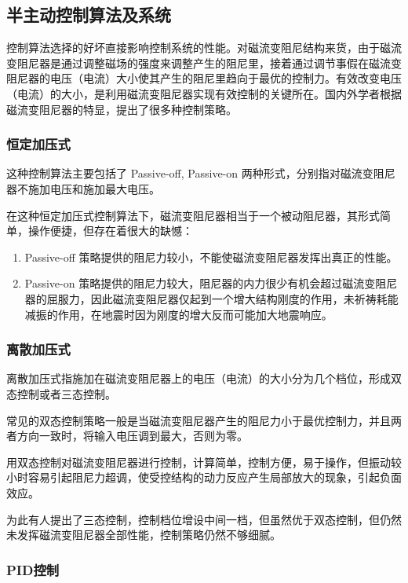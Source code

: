 
\subsection{半主动控制算法及系统}
控制算法选择的好坏直接影响控制系统的性能。对磁流变阻尼结构来货，由于磁流变阻尼器是通过调整磁场的强度来调整产生的阻尼里，接着通过调节事假在磁流变阻尼器的电压（电流）大小使其产生的阻尼里趋向于最优的控制力。有效改变电压（电流）的大小，是利用磁流变阻尼器实现有效控制的关键所在。国内外学者根据磁流变阻尼器的特显，提出了很多种控制策略。

\subsubsection{恒定加压式}
这种控制算法主要包括了 Passive-off, Passive-on 两种形式，分别指对磁流变阻尼器不施加电压和施加最大电压。

在这种恒定加压式控制算法下，磁流变阻尼器相当于一个被动阻尼器，其形式简单，操作便捷，但存在着很大的缺憾：
\begin{enumerate}
\item Passive-off 策略提供的阻尼力较小，不能使磁流变阻尼器发挥出真正的性能。
\item Passive-on 策略提供的阻尼力较大，阻尼器的内力很少有机会超过磁流变阻尼器的屈服力，因此磁流变阻尼器仅起到一个增大结构刚度的作用，未祈祷耗能减振的作用，在地震时因为刚度的增大反而可能加大地震响应。
\end{enumerate}

\subsubsection{离散加压式}
离散加压式指施加在磁流变阻尼器上的电压（电流）的大小分为几个档位，形成双态控制或者三态控制。

常见的双态控制策略一般是当磁流变阻尼器产生的阻尼力小于最优控制力，并且两者方向一致时，将输入电压调到最大，否则为零。

用双态控制对磁流变阻尼器进行控制，计算简单，控制方便，易于操作，但振动较小时容易引起阻尼力超调，使受控结构的动力反应产生局部放大的现象，引起负面效应。

为此有人提出了三态控制，控制档位增设中间一档，但虽然优于双态控制，但仍然未发挥磁流变阻尼器全部性能，控制策略仍然不够细腻。

\subsubsection{PID控制}

